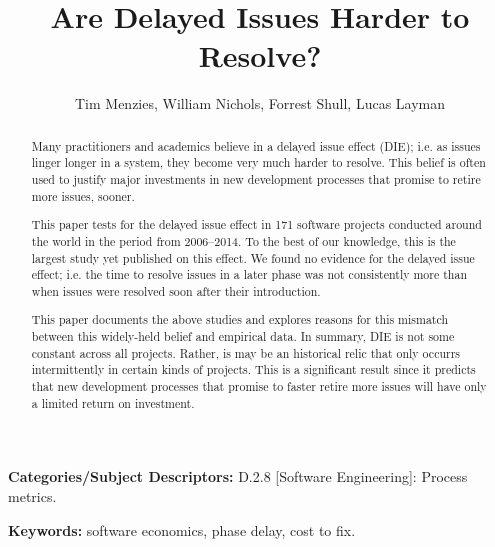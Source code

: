 \documentclass[smallcondesed]{svjour3}
\begin{document}
\date{}
 \title{Are Delayed Issues Harder to Resolve?}
 
 \author{Tim Menzies, William Nichols, Forrest Shull, Lucas Layman}
 
\maketitle
\begin{abstract}
Many  practitioners and academics
believe in a delayed issue effect (DIE); i.e.
 as issues linger longer in a system,
 they become very much harder to resolve.
This belief
is often  used to justify 
major investments in  new development
processes that promise to retire more issues, sooner.

This paper tests for the delayed issue effect in
171 software projects conducted around the world in the period from 2006--2014.
To the best of our knowledge,  this is the largest study
yet published on this effect.
We found no evidence for the  delayed issue effect; i.e.
the  time  to resolve 
issues in a later phase was  not consistently  more than  
when  issues were resolved soon after their introduction. 

This paper documents the above studies and explores reasons for this  mismatch between this widely-held
belief and empirical data.
In  summary, DIE is not some constant across all projects. Rather, is may be an historical relic that only occurrs intermittently 
in  certain kinds of projects.  This is a significant result since it predicts that  new development
processes that promise to faster retire more issues will have only a  limited return on investment. 
\end{abstract}

 \vspace{1mm}
\noindent
{\bf Categories/Subject Descriptors:} 
D.2.8 [Software Engineering]: Process metrics.

 

\vspace{1mm}
\noindent
{\bf Keywords:} software economics, phase delay, cost to fix.
 
\end{document}
